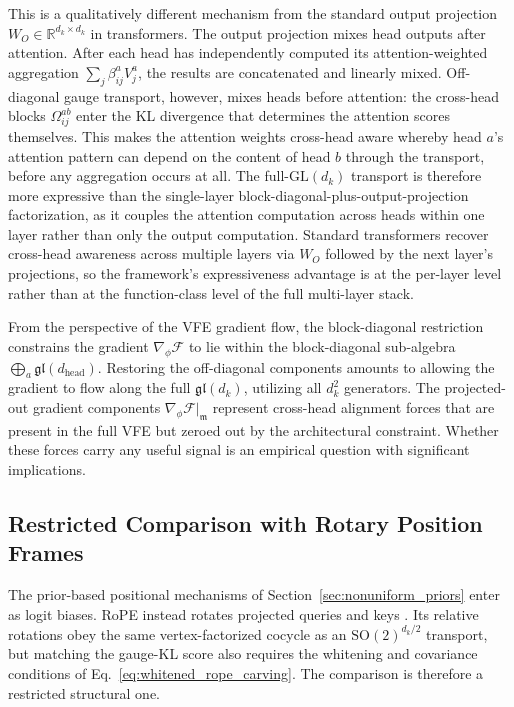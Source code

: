 \documentclass[twoside,11pt]{article}
\begin{document}
This is a qualitatively different mechanism from the standard output projection $W_O \in \mathbb{R}^{d_k \times d_k}$ in transformers. The output projection mixes head outputs after attention. After each head has independently computed its attention-weighted aggregation $\sum_j \beta_{ij}^a V_j^a$, the results are concatenated and linearly mixed. Off-diagonal gauge transport, however, mixes heads before attention: the cross-head blocks $\Omega_{ij}^{ab}$ enter the KL divergence that determines the attention scores themselves. This makes the attention weights cross-head aware whereby head $a$'s attention pattern can depend on the content of head $b$ through the transport, before any aggregation occurs at all. The full-$\mathrm{GL}(d_k)$ transport is therefore more expressive than the single-layer block-diagonal-plus-output-projection factorization, as it couples the attention computation across heads within one layer rather than only the output computation. Standard transformers recover cross-head awareness across multiple layers via $W_O$ followed by the next layer's projections, so the framework's expressiveness advantage is at the per-layer level rather than at the function-class level of the full multi-layer stack.

From the perspective of the VFE gradient flow, the block-diagonal restriction constrains the gradient $\nabla_\phi \mathcal{F}$ to lie within the block-diagonal sub-algebra $\bigoplus_a \mathfrak{gl}(d_{\text{head}})$. Restoring the off-diagonal components amounts to allowing the gradient to flow along the full $\mathfrak{gl}(d_k)$, utilizing all $d_k^2$ generators. The projected-out gradient components $\nabla_\phi \mathcal{F}\big|_{\mathfrak{m}}$ represent cross-head alignment forces that are present in the full VFE but zeroed out by the architectural constraint. Whether these forces carry any useful signal is an empirical question with significant implications.



\subsection{Restricted Comparison with Rotary Position Frames}
\label{sec:rope}

The prior-based positional mechanisms of Section~\ref{sec:nonuniform_priors} enter as logit biases. RoPE instead rotates projected queries and keys \citep{su2024roformer}. Its relative rotations obey the same vertex-factorized cocycle as an $\mathrm{SO}(2)^{d_k/2}$ transport, but matching the gauge-KL score also requires the whitening and covariance conditions of Eq.~\eqref{eq:whitened_rope_carving}. The comparison is therefore a restricted structural one.
\end{document}
